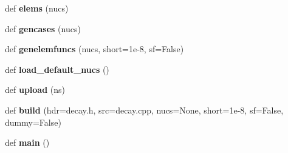 \begin{DoxyCompactItemize}
\item 
def {\bfseries elems} (nucs)\hypertarget{namespacedecaygen_aefb80200c848f900af82ea7a957bd357}{}\label{namespacedecaygen_aefb80200c848f900af82ea7a957bd357}

\item 
def {\bfseries gencases} (nucs)\hypertarget{namespacedecaygen_aad54514f5ef5d7f1a3a42ef6baa2b0c2}{}\label{namespacedecaygen_aad54514f5ef5d7f1a3a42ef6baa2b0c2}

\item 
def {\bfseries genelemfuncs} (nucs, short=1e-\/8, sf=\+False)\hypertarget{namespacedecaygen_a78942437fa895eb12ddad2193773e3ee}{}\label{namespacedecaygen_a78942437fa895eb12ddad2193773e3ee}

\item 
def {\bfseries load\+\_\+default\+\_\+nucs} ()\hypertarget{namespacedecaygen_ab917878a5a2030610eb4efc30d2a208b}{}\label{namespacedecaygen_ab917878a5a2030610eb4efc30d2a208b}

\item 
def {\bfseries upload} (ns)\hypertarget{namespacedecaygen_a78502cdd0e3af016cff3613d3c4f9d39}{}\label{namespacedecaygen_a78502cdd0e3af016cff3613d3c4f9d39}

\item 
def {\bfseries build} (hdr=\textquotesingle{}decay.\+h\textquotesingle{}, src=\textquotesingle{}decay.\+cpp\textquotesingle{}, nucs=None, short=1e-\/8, sf=\+False, dummy=\+False)\hypertarget{namespacedecaygen_aaf7400919588ae3a4c618da7b8412815}{}\label{namespacedecaygen_aaf7400919588ae3a4c618da7b8412815}

\item 
def {\bfseries main} ()\hypertarget{namespacedecaygen_a7df76be2c39839304c2ed0e37e95cc30}{}\label{namespacedecaygen_a7df76be2c39839304c2ed0e37e95cc30}

\end{DoxyCompactItemize}
